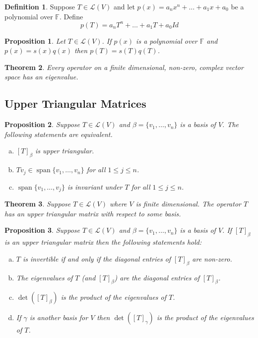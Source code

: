 \documentclass[12pt,letterpaper]{article}
\renewcommand{\span}{\operatorname {span}}
\theoremstyle{plain}
\newtheorem{theorem}{Theorem}[section]
\newtheorem{proposition}{Proposition}[section]
\theoremstyle{definition}
\newtheorem{definition}[theorem]{Definition}
\numberwithin{equation}{section}
\begin{document}
\begin{definition}Suppose  $T\in \mathcal{L}(V)$ and let $p(x)=a_nx^n+\ldots+a_1x+a_0$ be a polynomial over $\mathbb{F}$. Define
\[p(T)=a_nT^n+\ldots+a_1T+a_0Id\]

\end{definition}

\begin{proposition} Let $T\in \mathcal{L}(V)$. If $p(x)$ is a polynomial over $\mathbb{F}$ and $p(x)=s(x)q(x)$ then $p(T)=s(T)q(T)$. 
\end{proposition}


\begin{theorem} Every operator on a finite dimensional, non-zero, \emph{complex} vector space has an eigenvalue. 
\end{theorem}

\subsection{Upper Triangular Matrices}
\begin{proposition}Suppose $T\in \mathcal{L}(V)$ and $\beta=\{v_1, \ldots, v_n\}$ is a basis of $V$. The following statements are equivalent. 
\begin{enumerate}[(a)]
\item $[T]_\beta$ is upper triangular. 
\item $Tv_j\in \span\{v_1, \ldots, v_n\}$ for all $1\leq j\leq n$. 
\item $\span\{v_1, \ldots, v_j\}$ is invariant under $T$ for all $1\leq j\leq n$. 
\end{enumerate}
\end{proposition}

\begin{theorem}Suppose $T\in \mathcal{L}(V)$ where $V$ is finite dimensional. The operator $T$ has an upper triangular matrix with respect to some basis. 
\end{theorem}

\begin{proposition}Suppose $T\in \mathcal{L}(V)$ and $\beta=\{v_1, \ldots, v_n\}$ is a basis of $V$. If $[T]_\beta$ is an upper triangular matrix then the following statements hold:
\begin{enumerate}[(a)]
\item $T$ is invertible if and only if the diagonal entries of $[T]_\beta$ are non-zero. 
\item The eigenvalues of $T$ (and $[T]_\beta$) are the diagonal entries of $[T]_\beta$. 
\item $\det([T]_\beta)$ is the product of the eigenvalues of $T$. 
\item If $\gamma$ is another basis for $V$ then $\det([T]_\gamma)$ is the product of the eigenvalues of $T$. 
\end{enumerate}
\end{proposition}
\end{document}
